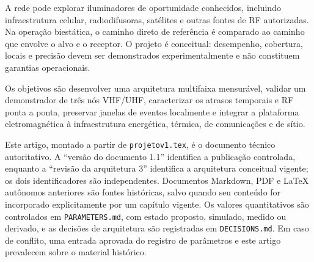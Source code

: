 A rede pode explorar iluminadores de oportunidade conhecidos, incluindo infraestrutura celular, radiodifusoras, satélites e outras fontes de RF autorizadas. Na operação biestática, o caminho direto de referência é comparado ao caminho que envolve o alvo e o receptor. O projeto é conceitual: desempenho, cobertura, locais e precisão devem ser demonstrados experimentalmente e não constituem garantias operacionais.

Os objetivos são desenvolver uma arquitetura multifaixa mensurável, validar um demonstrador de três nós VHF/UHF, caracterizar os atrasos temporais e RF ponta a ponta, preservar janelas de eventos localmente e integrar a plataforma eletromagnética à infraestrutura energética, térmica, de comunicações e de sítio.

Este artigo, montado a partir de \texttt{projetov1.tex}, é o documento técnico autoritativo. A ``versão do documento 1.1'' identifica a publicação controlada, enquanto a ``revisão da arquitetura 3'' identifica a arquitetura conceitual vigente; os dois identificadores são independentes. Documentos Markdown, PDF e LaTeX autônomos anteriores são fontes históricas, salvo quando seu conteúdo for incorporado explicitamente por um capítulo vigente. Os valores quantitativos são controlados em \texttt{PARAMETERS.md}, com estado proposto, simulado, medido ou derivado, e as decisões de arquitetura são registradas em \texttt{DECISIONS.md}. Em caso de conflito, uma entrada aprovada do registro de parâmetros e este artigo prevalecem sobre o material histórico.
